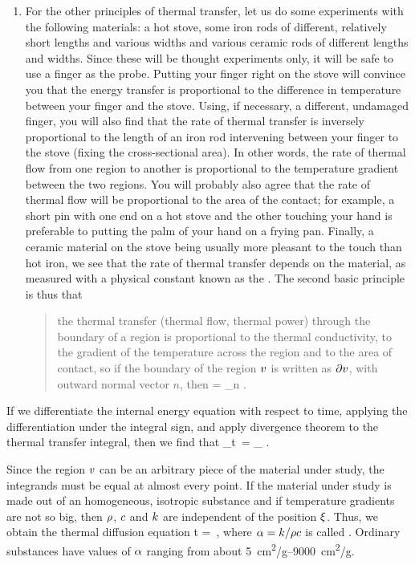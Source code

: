 \begin{enumerate}
%
\item For the other principles of thermal transfer, let us do some experiments with the following materials: a hot stove, some iron rods of different, relatively short lengths and various widths and various ceramic rods of different lengths and widths. Since these will be thought experiments only, it will be safe to use a finger as the probe. Putting your finger right on the stove will convince you that the energy transfer is proportional to the difference in temperature between your finger and the stove. Using, if necessary, a different, undamaged finger, you will also find that the rate of thermal transfer is inversely proportional to the length of an iron rod intervening between your finger to the stove (fixing the cross-sectional area). In other words, the rate of thermal flow from one region to another is proportional to the temperature gradient between the two regions. You will probably also agree that the rate of thermal flow will be proportional to the area of the contact; for example, a short pin with one end on a hot stove and the other touching your hand is preferable to putting the palm of your hand on a frying pan. Finally, a ceramic material on the stove being usually more pleasant to the touch than hot iron, we see that the rate of thermal transfer depends on the material, as measured with a physical constant known as the . The second basic principle is thus that
\begin{quote}
the thermal transfer (thermal flow, thermal power) through the boundary of a region is proportional to the thermal conductivity, to the gradient of the temperature across the region and to the area of contact, so if the boundary of the region $v$ is written as $\partial v$, with outward normal vector $n$, then
\beq
\flow\then = \int_{\bound\vol}\kthcond n\iprod\grad\temp{}\,\dx\surf\,.
\eeq
\end{quote}
\end{enumerate}

If we differentiate the internal energy equation with respect to time, applying the differentiation under the integral sign, and apply divergence theorem to the thermal transfer integral, then we find that
\beq
\int_\vol\ipd t\dens\kshcap\temp{}\,\dx\vol
=
\int_\vol\div\kthcond\grad\temp{}\,\dx\vol\,.
\eeq

Since the region $v$ can be an arbitrary piece of the material under study, the integrands must be equal at almost every point. If the material under study is made out of an homogeneous, isotropic substance and if temperature gradients are not so big, then $\rho$, $c$ and $k$ are independent of the position $\xi$. Thus, we obtain the thermal diffusion equation
\beq
\ipd t\temp{}
= \kthdiff\lap\temp{}\,,
\eeq
where $\alpha = k/\rho c$ is called . Ordinary substances have values of $\alpha$ ranging from about \SIrange{5}{9000}{cm^2/g}.

